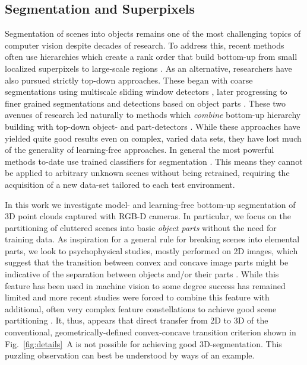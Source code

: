 \subsection{Segmentation and Superpixels}
Segmentation of scenes into objects remains one of the most challenging topics of computer vision despite decades of research. To address this, recent methods often use hierarchies which create a rank order that build bottom-up from small localized superpixels to large-scale regions \cite{Ren:ICCV2003,Ahuja:CVPR2008,Arbelaez:PAMI2011}. As an alternative, researchers have also pursued strictly top-down approaches. These began with coarse segmentations using multiscale sliding window detectors \cite{ViolaJones:IJCV2004}, later progressing to finer grained segmentations and detections based on object parts \cite{Felzenswalb:PAMI2010, Bourdev:ICCV2009}. These two avenues of research led naturally to methods which {\em combine} bottom-up hierarchy building with top-down object- and part-detectors \cite{Arbelaez:CVPR2012, Silberman:ECCV12, Gupta:CVPR2013}. While these approaches have yielded quite good results even on complex, varied data sets, they have lost much of the generality of learning-free approaches. In general the most powerful methods to-date use trained classifiers for segmentation \cite{Silberman:ECCV12, Gupta:CVPR2013}. This means they cannot be applied to arbitrary unknown scenes without being retrained, requiring the acquisition of a new data-set tailored to each test environment.

In this work we investigate model- and learning-free bottom-up segmentation of 3D point clouds captured with RGB-D cameras. In particular, we focus on the partitioning of cluttered scenes into basic {\em object parts} without the need for training data. As inspiration for a general rule for breaking scenes into elemental parts, we look to psychophysical studies, mostly performed on 2D images, which suggest that the transition between convex and concave image parts might be indicative of the separation between objects and/or their parts \cite{Koenderink1984,Vaina1990,Rosin2000,Matsuno2007,Cate2010,Bertamini2013}. While this feature has been used in machine vision to some degree \cite{Hoffman1987,Moosmann2009,Richtsfeld:IROS12,Ritter2012,Karpathy2013} success has remained limited and more recent studies were forced to combine this feature with additional, often very complex feature constellations to achieve good scene partitioning \cite{Richtsfeld:IROS12,Ritter2012,Karpathy2013}. It, thus, appears that direct transfer from 2D to 3D of the conventional, geometrically-defined convex-concave transition criterion shown in Fig.~\ref{fig:details}~A is not possible for achieving good 3D-segmentation. This puzzling observation can best be understood by ways of an example.

